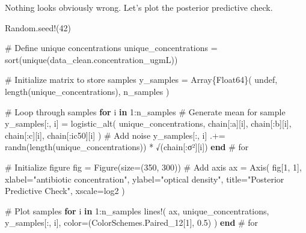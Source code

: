 \documentclass[
]{scrartcl}
\newenvironment{Shaded}{\begin{snugshade}}{\end{snugshade}}
\newcommand{\BuiltInTok}[1]{\textcolor[rgb]{0.00,0.23,0.31}{#1}}
\newcommand{\CommentTok}[1]{\textcolor[rgb]{0.37,0.37,0.37}{#1}}
\newcommand{\ConstantTok}[1]{\textcolor[rgb]{0.56,0.35,0.01}{#1}}
\newcommand{\ControlFlowTok}[1]{\textcolor[rgb]{0.00,0.23,0.31}{\textbf{#1}}}
\newcommand{\DataTypeTok}[1]{\textcolor[rgb]{0.68,0.00,0.00}{#1}}
\newcommand{\FloatTok}[1]{\textcolor[rgb]{0.68,0.00,0.00}{#1}}
\newcommand{\FunctionTok}[1]{\textcolor[rgb]{0.28,0.35,0.67}{#1}}
\newcommand{\KeywordTok}[1]{\textcolor[rgb]{0.00,0.23,0.31}{\textbf{#1}}}
\newcommand{\NormalTok}[1]{\textcolor[rgb]{0.00,0.23,0.31}{#1}}
\newcommand{\OperatorTok}[1]{\textcolor[rgb]{0.37,0.37,0.37}{#1}}
\newcommand{\StringTok}[1]{\textcolor[rgb]{0.13,0.47,0.30}{#1}}
\begin{document}
Nothing looks obviously wrong. Let's plot the posterior predictive
check.

\begin{Shaded}
\begin{Highlighting}[]
\BuiltInTok{Random}\NormalTok{.}\FunctionTok{seed!}\NormalTok{(}\FloatTok{42}\NormalTok{)}

\CommentTok{\# Define unique concentrations}
\NormalTok{unique\_concentrations }\OperatorTok{=} \FunctionTok{sort}\NormalTok{(}\FunctionTok{unique}\NormalTok{(data\_clean.concentration\_ugmL))}

\CommentTok{\# Initialize matrix to store samples}
\NormalTok{y\_samples }\OperatorTok{=} \FunctionTok{Array}\DataTypeTok{\{Float64\}}\NormalTok{(}
    \ConstantTok{undef}\NormalTok{, }\FunctionTok{length}\NormalTok{(unique\_concentrations), n\_samples}
\NormalTok{)}

\CommentTok{\# Loop through samples}
\ControlFlowTok{for}\NormalTok{ i }\KeywordTok{in} \FloatTok{1}\OperatorTok{:}\NormalTok{n\_samples}
    \CommentTok{\# Generate mean for sample}
\NormalTok{    y\_samples[}\OperatorTok{:}\NormalTok{, i] }\OperatorTok{=} \FunctionTok{logistic\_alt}\NormalTok{(}
\NormalTok{        unique\_concentrations,}
\NormalTok{        chain[}\OperatorTok{:}\NormalTok{a][i],}
\NormalTok{        chain[}\OperatorTok{:}\NormalTok{b][i],}
\NormalTok{        chain[}\OperatorTok{:}\NormalTok{c][i],}
\NormalTok{        chain[}\OperatorTok{:}\NormalTok{ic50][i]}
\NormalTok{    )}
    \CommentTok{\# Add noise}
\NormalTok{    y\_samples[}\OperatorTok{:}\NormalTok{, i] }\OperatorTok{.+=} \FunctionTok{randn}\NormalTok{(}\FunctionTok{length}\NormalTok{(unique\_concentrations)) }\OperatorTok{*} \FunctionTok{√}\NormalTok{(chain[}\OperatorTok{:}\NormalTok{σ²][i])}
\ControlFlowTok{end} \CommentTok{\# for}

\CommentTok{\# Initialize figure}
\NormalTok{fig }\OperatorTok{=} \FunctionTok{Figure}\NormalTok{(size}\OperatorTok{=}\NormalTok{(}\FloatTok{350}\NormalTok{, }\FloatTok{300}\NormalTok{))}
\CommentTok{\# Add axis}
\NormalTok{ax }\OperatorTok{=} \FunctionTok{Axis}\NormalTok{(}
\NormalTok{    fig[}\FloatTok{1}\NormalTok{, }\FloatTok{1}\NormalTok{],}
\NormalTok{    xlabel}\OperatorTok{=}\StringTok{"antibiotic concentration"}\NormalTok{,}
\NormalTok{    ylabel}\OperatorTok{=}\StringTok{"optical density"}\NormalTok{,}
\NormalTok{    title}\OperatorTok{=}\StringTok{"Posterior Predictive Check"}\NormalTok{,}
\NormalTok{    xscale}\OperatorTok{=}\NormalTok{log2}
\NormalTok{)}

\CommentTok{\# Plot samples}
\ControlFlowTok{for}\NormalTok{ i }\KeywordTok{in} \FloatTok{1}\OperatorTok{:}\NormalTok{n\_samples}
    \FunctionTok{lines!}\NormalTok{(}
\NormalTok{        ax,}
\NormalTok{        unique\_concentrations,}
\NormalTok{        y\_samples[}\OperatorTok{:}\NormalTok{, i],}
\NormalTok{        color}\OperatorTok{=}\NormalTok{(ColorSchemes.Paired\_12[}\FloatTok{1}\NormalTok{], }\FloatTok{0.5}\NormalTok{)}
\NormalTok{    )}
\ControlFlowTok{end} \CommentTok{\# for}


\end{Highlighting}
\end{Shaded}
\end{document}

